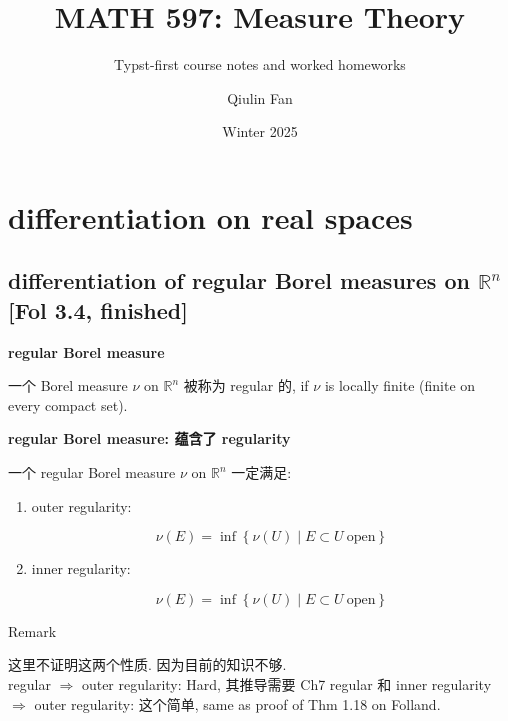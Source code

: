 \documentclass{qlnotes-export}
\title{MATH 597: Measure Theory}
\subtitle{Typst-first course notes and worked homeworks}
\author{Qiulin Fan}
\date{Winter 2025}
\begin{document}
\mainmatter
\chapter{differentiation on real spaces}\label{differentiation-on-real-spaces}

\section{\texorpdfstring{differentiation of regular Borel measures on \({\mathbb{R}}^{n}\) {[}Fol 3.4, finished{]}}{differentiation of regular Borel measures on \{\textbackslash mathbb\{R\}\}\^{}\{n\} {[}Fol 3.4, finished{]}}}

\begin{definition}{\protect{}\label{kn-regular-borel-measure}{\textbf{regular
Borel measure}}}

一个 Borel measure \(\nu\) on \({\mathbb{R}}^{n}\) 被称为 regular 的, if \(\nu\) is locally finite (finite on every compact set).

\end{definition}

\begin{theorem}{\protect{}\label{kn-regular-borel-measure-regularity}{\textbf{regular
Borel measure: 蕴含了 regularity}}}

一个 regular Borel measure \(\nu\) on \({\mathbb{R}}^{n}\) 一定满足:

\begin{enumerate}
\item
  outer regularity:

  \[\nu(E) = \inf\left\{ {\nu(U) \mid E \subset U\ \text{open}} \right\}\]
\item
  inner regularity:

  \[\nu(E) = \inf\left\{ {\nu(U) \mid E \subset U\ \text{open}} \right\}\]
\end{enumerate}

\end{theorem}

\begin{qlremark}{Remark}

这里不证明这两个性质. 因为目前的知识不够.\\
regular \(\Longrightarrow\) outer regularity: Hard, 其推导需要 Ch7 regular 和 inner regularity \(\Longrightarrow\) outer regularity: 这个简单, same as proof of Thm 1.18 on Folland.

\end{qlremark}
\end{document}
